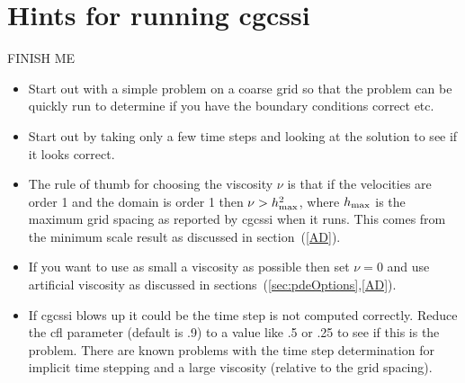 \documentclass{article}
\newcommand{\Index}[1]{#1\index{#1}}
\begin{document}












\section{Hints for running cgcssi}

FINISH ME

\begin{itemize}
  \item Start out with a simple problem on a coarse grid so that the problem
      can be quickly run to determine if you have the boundary conditions correct etc.
  \item Start out by taking only a few time steps and looking at the solution to
      see if it looks correct.
  \item The rule of thumb for choosing the viscosity $\nu$ is that if the velocities
    are order 1 and the domain is order 1 then $\nu > h_{\rm max}^2$, where 
    $h_{\rm max}$ is the maximum grid spacing as reported by cgcssi when it runs.
    This comes from the minimum scale result as discussed in section~(\ref{AD}).
  \item If you want to use as small a viscosity as possible then set $\nu=0$
    and use \Index{artificial viscosity} as discussed in sections~(\ref{sec:pdeOptions},\ref{AD}).
  \item If cgcssi blows up it could be the time step is not computed correctly. Reduce
   the cfl parameter (default is .9) to a value like .5 or .25 to see if this is the problem.
   There are known problems with the time step determination for implicit time stepping and
   a large viscosity (relative to the grid spacing).
\end{itemize}
\end{document}
